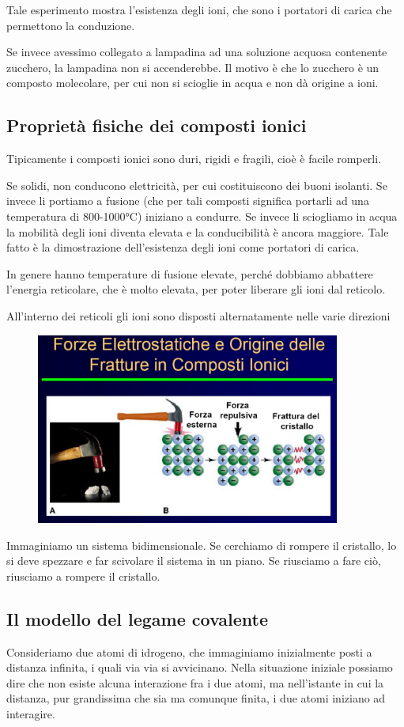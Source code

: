 Tale esperimento mostra l'esistenza degli ioni, che sono i portatori di carica che permettono la conduzione.

Se invece avessimo collegato a lampadina ad una soluzione acquosa contenente zucchero, la lampadina non si accenderebbe. Il motivo è che lo zucchero è un composto molecolare, per cui non si scioglie in acqua e non dà origine a ioni.
\subsection{Proprietà fisiche dei composti ionici}
Tipicamente i composti ionici sono duri, rigidi e fragili, cioè è facile romperli.

Se solidi, non conducono elettricità, per cui costituiscono dei buoni isolanti. Se invece li portiamo a fusione (che per tali composti significa portarli ad una temperatura di 800-1000°C) iniziano a condurre. Se invece li sciogliamo in acqua la mobilità degli ioni diventa elevata e la conducibilità è ancora maggiore. Tale fatto è la dimostrazione dell'esistenza degli ioni come portatori di carica.

In genere hanno temperature di fusione elevate, perché dobbiamo abbattere l'energia reticolare, che è molto elevata, per poter liberare gli ioni dal reticolo.

All'interno dei reticoli gli ioni sono disposti alternatamente nelle varie direzioni
\begin{figure}[htp]
    \centering
    \includegraphics[width=10cm]{immagini/struttura-composti-ionici.png}
\end{figure}
Immaginiamo un sistema bidimensionale. Se cerchiamo di rompere il cristallo, lo si deve spezzare e far scivolare il sistema in un piano. Se riusciamo a fare ciò, riusciamo a rompere il cristallo.
\subsection{Il modello del legame covalente}
Consideriamo due atomi di idrogeno, che immaginiamo inizialmente posti a distanza infinita, i quali via via si avvicinano. Nella situazione iniziale possiamo dire che non esiste alcuna interazione fra i due atomi, ma nell'istante in cui la distanza, pur grandissima che sia ma comunque finita, i due atomi iniziano ad interagire.

